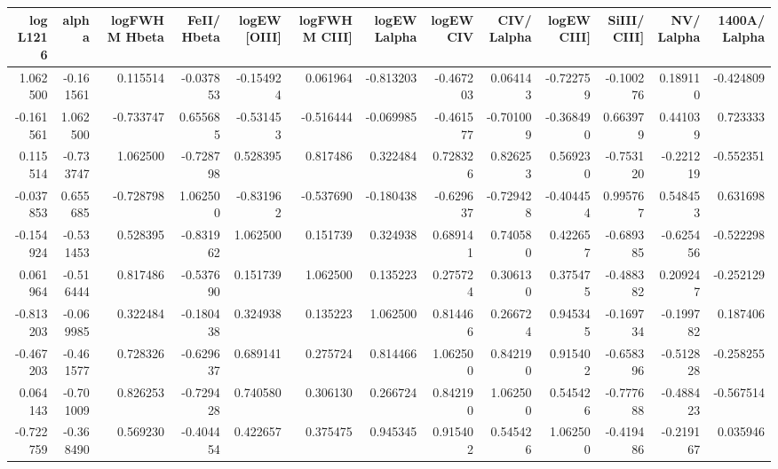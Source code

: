 \begin{tabular}{rrrrrrrrrrrrr}
\toprule
 log L1216 &     alpha &  logFWHM Hbeta  &  FeII/ Hbeta  &  logEW [OIII] &  logFWHM CIII] &  logEW Lalpha &  logEW CIV &  CIV/ Lalpha &  logEW CIII] &  SiIII/ CIII] &  NV/ Lalpha &  1400A/ Lalpha \\
\midrule
  1.062500 & -0.161561 &        0.115514 &     -0.037853 &     -0.154924 &       0.061964 &     -0.813203 &  -0.467203 &     0.064143 &    -0.722759 &     -0.100276 &    0.189110 &      -0.424809 \\
 -0.161561 &  1.062500 &       -0.733747 &      0.655685 &     -0.531453 &      -0.516444 &     -0.069985 &  -0.461577 &    -0.701009 &    -0.368490 &      0.663979 &    0.441039 &       0.723333 \\
  0.115514 & -0.733747 &        1.062500 &     -0.728798 &      0.528395 &       0.817486 &      0.322484 &   0.728326 &     0.826253 &     0.569230 &     -0.753120 &   -0.221219 &      -0.552351 \\
 -0.037853 &  0.655685 &       -0.728798 &      1.062500 &     -0.831962 &      -0.537690 &     -0.180438 &  -0.629637 &    -0.729428 &    -0.404454 &      0.995767 &    0.548453 &       0.631698 \\
 -0.154924 & -0.531453 &        0.528395 &     -0.831962 &      1.062500 &       0.151739 &      0.324938 &   0.689141 &     0.740580 &     0.422657 &     -0.689385 &   -0.625456 &      -0.522298 \\
  0.061964 & -0.516444 &        0.817486 &     -0.537690 &      0.151739 &       1.062500 &      0.135223 &   0.275724 &     0.306130 &     0.375475 &     -0.488382 &    0.209247 &      -0.252129 \\
 -0.813203 & -0.069985 &        0.322484 &     -0.180438 &      0.324938 &       0.135223 &      1.062500 &   0.814466 &     0.266724 &     0.945345 &     -0.169734 &   -0.199782 &       0.187406 \\
 -0.467203 & -0.461577 &        0.728326 &     -0.629637 &      0.689141 &       0.275724 &      0.814466 &   1.062500 &     0.842190 &     0.915402 &     -0.658396 &   -0.512828 &      -0.258255 \\
  0.064143 & -0.701009 &        0.826253 &     -0.729428 &      0.740580 &       0.306130 &      0.266724 &   0.842190 &     1.062500 &     0.545426 &     -0.777688 &   -0.488423 &      -0.567514 \\
 -0.722759 & -0.368490 &        0.569230 &     -0.404454 &      0.422657 &       0.375475 &      0.945345 &   0.915402 &     0.545426 &     1.062500 &     -0.419486 &   -0.219167 &       0.035946 \\

\end{tabular}
